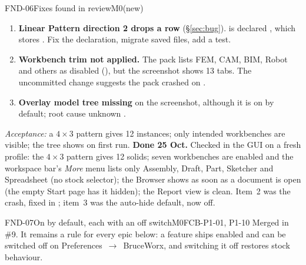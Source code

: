 \begin{epic}{FND-06}{Fixes found in review}{M0}{\stDone}{(new)}
\begin{enumerate}
  \item \textbf{Linear Pattern direction 2 drops a row} (\S\ref{sec:bug}).  is declared
        \code{(\{\})}, which stores \code{[0.0]}. Fix the declaration, migrate saved files, add a test.
  \item \textbf{Workbench trim not applied.} The pack lists FEM, CAM, BIM, Robot and others as disabled
        (), but the screenshot shows 13 tabs. The uncommitted
         change suggests the pack crashed on  \verify.
  \item \textbf{Overlay model tree missing} on the screenshot, although it is on by default; root cause unknown \verify.
\end{enumerate}
\emph{Acceptance:} a $4\times3$ pattern gives 12 instances; only intended workbenches are visible; the tree shows on first run.
\textbf{Done 25 Oct.} Checked in the GUI on a fresh profile: the $4\times3$ pattern gives 12 solids; seven
workbenches are enabled and the workspace bar's \emph{More} menu lists only Assembly, Draft, Part, Sketcher and
Spreadsheet (no stock selector); the Browser shows as soon as a document is open (the empty Start page has it
hidden); the Report view is clean. Item~2 was the  crash, fixed in ; item~3 was the
auto-hide default, now off.
\end{epic}

\begin{epic}{FND-07}{On by default, each with an off switch}{M0}{\stDone}{FCB-P1-01, P1-10}
Merged in \#9. It remains a rule for every epic below: a feature ships enabled and can be switched off on
Preferences~$\rightarrow$~BruceWorx, and switching it off restores stock behaviour.
\end{epic}

